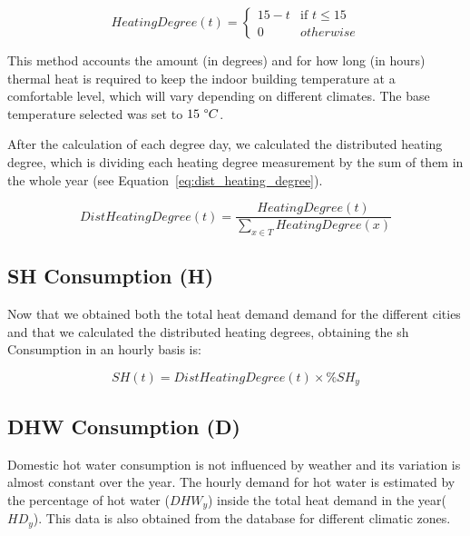 \documentclass{article}
\begin{document}
\begin{equation}
\label{eq:heating_degree}
    HeatingDegree(t)=
\left\{
	\begin{array}{ll}
		15 - t  
		    & \mbox{if } t \leq 15 \\
		0 
		    & otherwise
	\end{array}
\right.
\end{equation}

This method accounts the amount (in degrees) and for how long (in hours) thermal heat is required to keep the indoor building temperature at a comfortable level, which will vary depending on different climates. The base temperature selected was set to $15\ \degree C$.

After the calculation of each degree day, we calculated the distributed heating degree, which is dividing each heating degree measurement by the sum of them in the whole year (see Equation~\ref{eq:dist_heating_degree}).

\begin{equation}
\label{eq:dist_heating_degree}
    DistHeatingDegree(t) = \frac{HeatingDegree(t)}{\sum_{x \in T} HeatingDegree(x)}
\end{equation}

\subsection{SH Consumption (H)}

Now that we obtained both the total heat demand demand for the different cities and that we calculated the distributed heating degrees, obtaining the \gls{sh} Consumption in an hourly basis is:

\begin{equation}
\label{eq:sh_consumption}
    SH(t) = DistHeatingDegree(t) \times \%SH_{y}
\end{equation}



\subsection{DHW Consumption (D)}

Domestic hot water consumption is not influenced by weather and its variation is almost constant over the year. The hourly demand for hot water is estimated by the percentage of hot water ($DHW_y$) inside the total heat demand in the year($HD_y$). This data is also obtained from the \inspire database for different climatic zones. 
\end{document}
